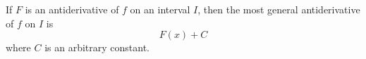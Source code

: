\begin{frame}
\begin{theorem}
If $F$ is an antiderivative of $f$ on an interval $I$, then the most general antiderivative of $f$ on $I$ is
\[
F(x) + C
\]
where $C$ is an arbitrary constant.
\end{theorem}
\end{frame}
